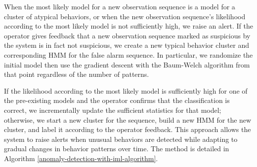 When the most likely model for a new observation sequence is a model
for a cluster of atypical behaviors, or when the new observation
sequence's likelihood according to the most likely model is not
sufficiently high, we raise an alert. If the operator gives feedback
that a new observation sequence marked as suspicious by the system is
in fact not suspicious, we create a new typical behavior cluster and
corresponding HMM for the false alarm sequence. In particular, we 
randomize the initial model then use the gradient descent with the 
Baum-Welch algorithm from that point regardless of the number of 
patterns.

If the likelihood according to the most likely model is 
sufficiently high for one of the
pre-existing models and the operator confirms that the classification
is correct, we incrementally update the sufficient statistics for that
model; otherwise, we start a new cluster for the sequence, build a new
HMM for the new cluster, and label it according to the operator
feedback. This approach allows the system to raise alerts when unusual
behaviors are detected while adapting to gradual changes in behavior
patterns over time. The method is detailed in Algorithm
\ref{anomaly-detection-with-iml-algorithm}.

